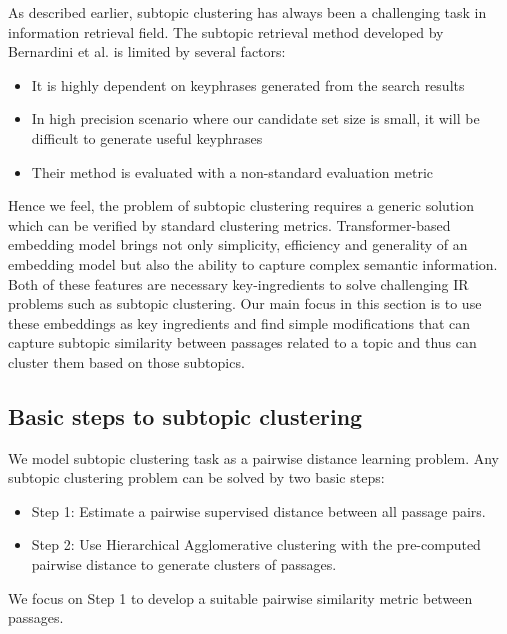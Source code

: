 As described earlier, subtopic clustering has always been a challenging task in information retrieval field. The subtopic retrieval method developed by Bernardini et al. is limited by several factors: 
\begin{itemize}
    \item It is highly dependent on keyphrases generated from the search results
    \item In high precision scenario where our candidate set size is small, it will be difficult to generate useful keyphrases
    \item Their method is evaluated with a non-standard evaluation metric
\end{itemize}
Hence we feel, the problem of subtopic clustering requires a generic solution which can be verified by standard clustering metrics. Transformer-based embedding model brings not only simplicity, efficiency and generality of an embedding model but also the ability to capture complex semantic information. Both of these features are necessary key-ingredients to solve challenging IR problems such as subtopic clustering. Our main focus in this section is to use these embeddings as key ingredients and find simple modifications that can capture subtopic similarity between passages related to a topic and thus can cluster them based on those subtopics.

\subsection{Basic steps to subtopic clustering} We model subtopic clustering task as a pairwise distance learning problem. Any subtopic clustering problem can be solved by two basic steps:
\begin{itemize}
    \item Step 1: Estimate a pairwise supervised distance between all passage pairs.
    \item Step 2: Use Hierarchical Agglomerative clustering with the pre-computed pairwise distance to generate clusters of passages.
\end{itemize}

We focus on Step 1 to develop a suitable pairwise similarity metric between passages.

